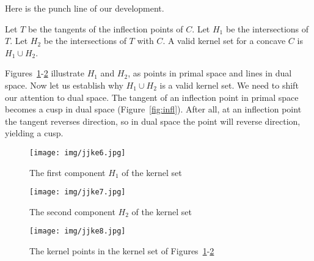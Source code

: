 \documentclass[12pt]{article}
\begin{document}
%	

Here is the punch line of our development.

\begin{theorem}
\label{thm:kernelset}
Let $T$ be the tangents of the inflection points of $C$.
Let $H_1$ be the intersections of $T$.
Let $H_2$ be the intersections of $T$ with $C$.
A valid kernel set for a concave $C$ is $H_1 \cup H_2$.
\end{theorem}

Figures~\ref{fig:comp1}-\ref{fig:comp2} 
illustrate $H_1$ and $H_2$, as points in primal space
and lines in dual space.
Now let us establish why $H_1 \cup H_2$ is a valid kernel set.
We need to shift our attention to dual space.
The tangent of an inflection point in primal space becomes a cusp in dual space
(Figure~\ref{fig:infl}).
After all, at an inflection point the tangent reverses direction,
so in dual space the point will reverse direction, yielding a cusp.

\begin{figure}[h]
\begin{center}
\texttt{[image: img/jjke6.jpg]}
\end{center}
\caption{The first component $H_1$ of the kernel set}
\label{fig:comp1}
\end{figure}

\begin{figure}
\begin{center}
\texttt{[image: img/jjke7.jpg]}
\end{center}
\caption{The second component $H_2$ of the kernel set}
\label{fig:comp2}
\end{figure}

\begin{figure}
\begin{center}
\texttt{[image: img/jjke8.jpg]}
\end{center}
\caption{The kernel points in the kernel set of Figures~\ref{fig:comp1}-\ref{fig:comp2}}
\label{fig:free}
\end{figure}
\end{document}
